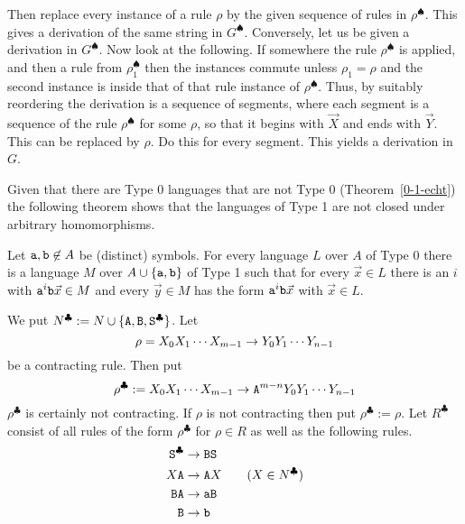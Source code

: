Then replace every instance of a rule $\rho$ by the given
sequence of rules in $\rho^{\spadesuit}$. This gives a derivation
of the same string in $G^{\spadesuit}$. Conversely, let us be
given a derivation in $G^{\spadesuit}$. Now look at the following.
If somewhere the rule $\rho^{\spadesuit}$ is applied, and then a
rule from $\rho_{1}^{\spadesuit}$ then the instances commute unless
$\rho_{1} = \rho$ and the second instance is inside that of
that rule instance of $\rho^{\spadesuit}$. Thus, by suitably
reordering the derivation is a sequence of segments, where each
segment is a sequence of the rule $\rho^{\spadesuit}$ for some
$\rho$, so that it begins with $\vec{X}$ and ends with
$\vec{Y}$. This can be replaced by $\rho$. Do this for every segment.
This yields a derivation in $G$.
\proofend

Given that there are Type 0 languages that are not Type 0 
(Theorem~\ref{0-1-echt}) the following theorem shows that the 
languages of Type 1 are not closed under arbitrary homomorphisms. 
\begin{thm}
\label{thm:erase}
Let $\mbox{\tt a}, \mbox{\tt b} \not\in A$ be (distinct) symbols.
For every language $L$ over $A$ of Type 0 there is a language
$M$ over $A \cup \{\mbox{\tt a}, \mbox{\tt b}\}$ of Type 1 such that
for every $\vec{x} \in L$ there is an $i$ with
$\mbox{\tt a}^i \mbox{\tt b} \vec{x} \in M$ and
every $\vec{y} \in M$ has the form $\mbox{\tt a}^i \mbox{\tt b} \vec{x}$
with $\vec{x} \in L$.
\end{thm}
\proofbeg
We put $N^{\clubsuit} := N \cup \{\mbox{\tt A}, \mbox{\tt B},
\mbox{\tt S}^{\clubsuit}\}$. Let 
\begin{equation}
\rho = X_0 X_1 \dotsb X_{m-1} \rightarrow Y_0 Y_1 \dotsb Y_{n-1}
\end{equation}
be a contracting rule. Then put 
\begin{equation}
\rho^{\clubsuit} := X_0 X_1 \dotsb X_{m-1} \rightarrow \mbox{\tt A}^{m-n} 
Y_0 Y_1 \dotsb Y_{n-1}
\end{equation}
$\rho^{\clubsuit}$ is certainly not contracting. If
$\rho$ is not contracting then put $\rho^{\clubsuit} :=
\rho$. Let $R^{\clubsuit}$ consist of all rules of the form
$\rho^{\clubsuit}$ for $\rho \in R$ as well as the following rules.
\begin{equation}
\begin{split}
\mbox{\tt S}^{\clubsuit}  & \rightarrow \mbox{\tt BS}  \\
X \mbox{\tt A} & \rightarrow \mbox{\tt A}X \qquad (X \in N^{\clubsuit})  \\
\mbox{\tt BA} & \rightarrow \mbox{\tt aB} \\
\mbox{\tt B}  & \rightarrow \mbox{\tt b}
\end{split}
\end{equation}
